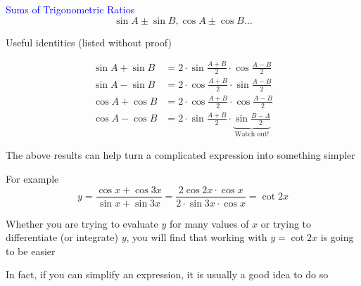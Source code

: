 \documentclass[14pt,fleqn]{extarticle}
\begin{document}
\begin{skill}
\textcolor{blue}{Sums of Trigonometric Ratios}
\[ \sin A \pm \sin B, \cos A \pm \cos B \ldots \]
\end{skill}
%

\newcard

Useful identities (listed without proof) 

%
\begin{align}
  \sin A + \sin B &= 2\cdot\sin\frac{A+B}{2}\cdot\cos\frac{A-B}{2} \\
  \sin A - \sin B &= 2\cdot\cos\frac{A+B}{2}\cdot\sin\frac{A-B}{2}  \\
  \cos A + \cos B &= 2\cdot\cos\frac{A+B}{2}\cdot\cos\frac{A-B}{2} \\
  \cos A - \cos B &= 2\cdot\sin\frac{A+B}{2}\cdot\underbrace{\sin\frac{B-A}{2}}_{\text{Watch out!}}
\end{align}

The above results can help turn a complicated expression into something simpler \newline 

For example 
\small\[y = \frac{\cos x + \cos 3x}{\sin x + \sin 3x} = \frac{2\cos 2x\cdot \cos x}{2\cdot \sin 3x\cdot \cos x} = \cot 2x\]\normalsize

Whether you are trying to evaluate $y$ for many values of $x$ or trying to differentiate (or integrate) $y$, you will find that working with $y=\cot 2x$ is going to be easier\newline 

In fact, if you can simplify an expression, it is usually a good idea to do so
\end{document}

